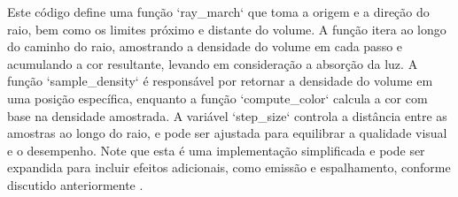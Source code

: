 Este código define uma função `ray\_march` que toma a origem e a direção do raio, bem como os limites próximo e distante do volume. A função itera ao longo do caminho do raio, amostrando a densidade do volume em cada passo e acumulando a cor resultante, levando em consideração a absorção da luz. A função `sample\_density` é responsável por retornar a densidade do volume em uma posição específica, enquanto a função `compute\_color` calcula a cor com base na densidade amostrada. A variável `step\_size` controla a distância entre as amostras ao longo do raio, e pode ser ajustada para equilibrar a qualidade visual e o desempenho. Note que esta é uma implementação simplificada e pode ser expandida para incluir efeitos adicionais, como emissão e espalhamento, conforme discutido anteriormente \cite{Pharr2016}.
